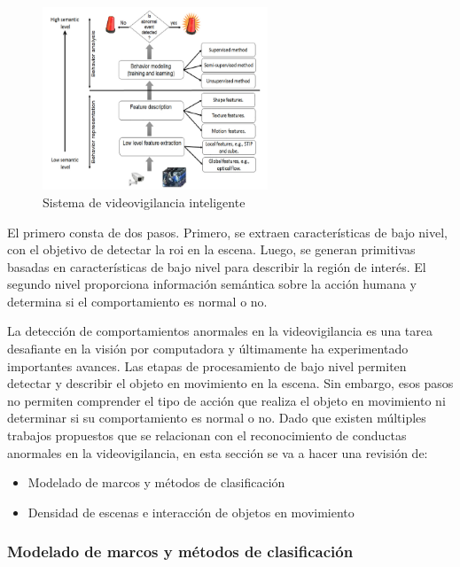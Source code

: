\begin{figure}[ht]
\centering
\includegraphics[width=0.6\textwidth]{img/chapters/estado-del-arte/video-surveillance-system.png}
\caption{\label{fig:video-surveillance-system}Sistema de videovigilancia inteligente \cite{BENMABROUK2018480}}
\end{figure}

El primero consta de dos pasos. Primero, se extraen características de bajo nivel, con el objetivo de detectar la \gls{roi} en la escena. Luego, se generan primitivas basadas en características de bajo nivel para describir la región de interés. El segundo nivel proporciona información semántica sobre la acción humana y determina si el comportamiento es normal o no.

La detección de comportamientos anormales en la videovigilancia es una tarea desafiante en la visión por computadora y últimamente ha experimentado importantes avances. Las etapas de procesamiento de bajo nivel permiten detectar y describir el objeto en movimiento en la escena. Sin embargo, esos pasos no permiten comprender el tipo de acción que realiza el objeto en movimiento ni determinar si su comportamiento es normal o no. Dado que existen múltiples trabajos propuestos que se relacionan con el reconocimiento de conductas anormales en la videovigilancia, en esta sección se va a hacer una revisión de:

\begin{itemize}
    \item Modelado de marcos y métodos de clasificación
    \item Densidad de escenas e interacción de objetos en movimiento
\end{itemize}

\subsubsection*{Modelado de marcos y métodos de clasificación}
\label{subsubsec:modelado-frameworks-métodos-clasificación}

